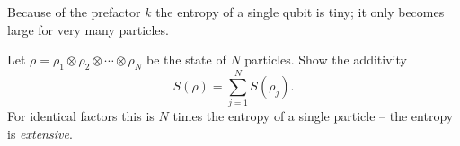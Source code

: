 Because of the prefactor $k$ the entropy of a single qubit is tiny; it only becomes large for very many particles.

\begin{exercise}\label{ex:entropie-additiv}
	Let $\rho = \rho_1\otimes\rho_2\otimes\cdots\otimes\rho_N$ be the state of $N$ particles. Show the additivity
	\begin{equation}
		S(\rho) = \sum_{j=1}^N S(\rho_j).
	\end{equation}
	For identical factors this is $N$ times the entropy of a single particle -- the entropy is \emph{extensive}.
\end{exercise}